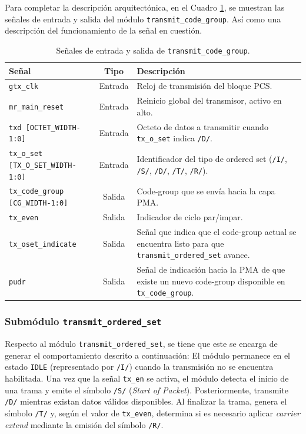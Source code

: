 Para completar la descripción arquitectónica, en el Cuadro \ref{tab:transmit_code_group_senales}, se muestran las señales de entrada y salida del módulo \texttt{transmit\_code\_group}.
Así como una descripción del funcionamiento de la señal en cuestión.

\begin{table}[htb]
    \centering
    \begin{tabular}{lcp{7cm}}
    \hline
    \textbf{Señal} & \textbf{Tipo} & \textbf{Descripción} \\ \hline
    \texttt{gtx\_clk} & Entrada & Reloj de transmisión del bloque PCS. \\
    \texttt{mr\_main\_reset} & Entrada & Reinicio global del transmisor, activo en alto. \\
    \texttt{txd [OCTET\_WIDTH-1:0]} & Entrada & Octeto de datos a transmitir cuando \texttt{tx\_o\_set} indica \texttt{/D/}. \\
    \texttt{tx\_o\_set [TX\_O\_SET\_WIDTH-1:0]} & Entrada & Identificador del tipo de ordered set (\texttt{/I/}, \texttt{/S/}, \texttt{/D/}, \texttt{/T/}, \texttt{/R/}). \\
    \texttt{tx\_code\_group [CG\_WIDTH-1:0]} & Salida & Code-group que se envía hacia la capa PMA. \\
    \texttt{tx\_even} & Salida & Indicador de ciclo par/impar. \\
    \texttt{tx\_oset\_indicate} & Salida & Señal que indica que el code-group actual se encuentra listo para que \texttt{transmit\_ordered\_set} avance. \\
    \texttt{pudr} & Salida & Señal de indicación hacia la PMA de que existe un nuevo code-group disponible en \texttt{tx\_code\_group}. \\ \hline
    \end{tabular}
    \caption{Señales de entrada y salida de \texttt{transmit\_code\_group}.}
    \label{tab:transmit_code_group_senales}
\end{table}

\subsubsection{Submódulo \texttt{transmit\_ordered\_set}}

Respecto al módulo \texttt{transmit\_ordered\_set}, se tiene que este se encarga de generar el comportamiento descrito a continuación:
El módulo permanece en el estado \texttt{IDLE} (representado por \texttt{/I/}) cuando la transmisión no se encuentra habilitada.
Una vez que la señal \texttt{tx\_en} se activa, el módulo detecta el inicio de una trama y emite el símbolo \texttt{/S/} (\textit{Start of Packet}).
Posteriormente, transmite \texttt{/D/} mientras existan datos válidos disponibles.
Al finalizar la trama, genera el símbolo \texttt{/T/} y, según el valor de \texttt{tx\_even}, determina si es necesario aplicar \textit{carrier extend} mediante la emisión del símbolo \texttt{/R/}.

